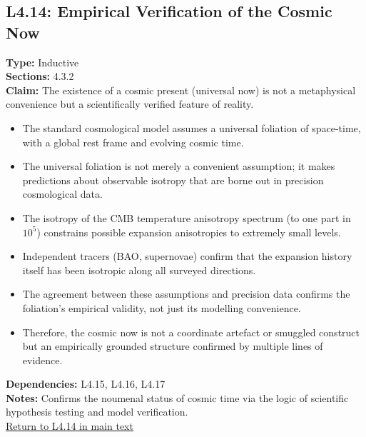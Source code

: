 \documentclass[12pt]{book}
\newcommand{\returnlink}[1]{\hyperref[logic:#1]{Return to #1 in main text}\xspace}
\begin{document}
\subsection*{L4.14: Empirical Verification of the Cosmic Now}
\label{appendix:L4.14}
\textbf{Type:} Inductive \\
\textbf{Sections:} 4.3.2 \\
\textbf{Claim:} The existence of a cosmic present (universal now) is not a metaphysical convenience but a scientifically verified feature of reality.
\begin{itemize}
  \item The standard cosmological model assumes a universal foliation of space-time, with a global rest frame and evolving cosmic time.
  \item The universal foliation is not merely a convenient assumption; it makes predictions about observable isotropy that are borne out in precision cosmological data.
  \item The isotropy of the CMB temperature anisotropy spectrum (to one part in $10^5$) constrains possible expansion anisotropies to extremely small levels.
  \item Independent tracers (BAO, supernovae) confirm that the expansion history itself has been isotropic along all surveyed directions.
  \item The agreement between these assumptions and precision data confirms the foliation's empirical validity, not just its modelling convenience.
  \item Therefore, the cosmic now is not a coordinate artefact or smuggled construct but an empirically grounded structure confirmed by multiple lines of evidence.
\end{itemize}
\textbf{Dependencies:} L4.15, L4.16, L4.17 \\
\textbf{Notes:} Confirms the noumenal status of cosmic time via the logic of scientific hypothesis testing and model verification. \\
\returnlink{L4.14}
\end{document}
